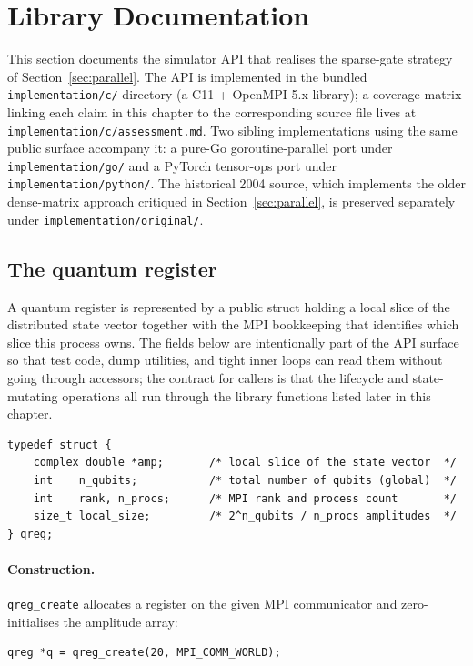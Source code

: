 \setcounter{equation}{0}
\section{Library Documentation}
\label{sec:libdoc}

This section documents the simulator API that realises the sparse-gate strategy of Section~\ref{sec:parallel}. The API is implemented in the bundled \texttt{implementation/c/} directory (a C11 + OpenMPI 5.x library); a coverage matrix linking each claim in this chapter to the corresponding source file lives at \texttt{implementation/c/assessment.md}. Two sibling implementations using the same public surface accompany it: a pure-Go goroutine-parallel port under \texttt{implementation/\allowbreak go/} and a PyTorch tensor-ops port under \texttt{implementation/\allowbreak python/}. The historical 2004 source, which implements the older dense-matrix approach critiqued in Section~\ref{sec:parallel}, is preserved separately under \texttt{implementation/\allowbreak original/}.

\subsection{The quantum register}

A quantum register is represented by a public struct holding a local slice of the distributed state vector together with the MPI bookkeeping that identifies which slice this process owns. The fields below are intentionally part of the API surface so that test code, dump utilities, and tight inner loops can read them without going through accessors; the contract for callers is that the lifecycle and state-mutating operations all run through the library functions listed later in this chapter.

\begin{lstlisting}
typedef struct {
    complex double *amp;       /* local slice of the state vector  */
    int    n_qubits;           /* total number of qubits (global)  */
    int    rank, n_procs;      /* MPI rank and process count       */
    size_t local_size;         /* 2^n_qubits / n_procs amplitudes  */
} qreg;
\end{lstlisting}

\paragraph{Construction.} \verb|qreg_create| allocates a register on the given MPI communicator and zero-initialises the amplitude array:
\begin{lstlisting}
qreg *q = qreg_create(20, MPI_COMM_WORLD);
\end{lstlisting}

